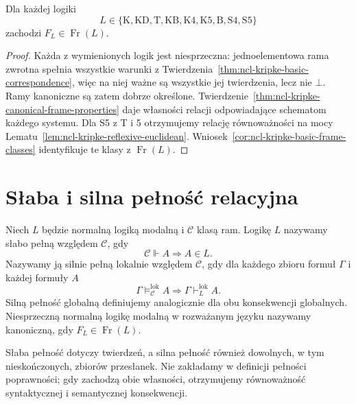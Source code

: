 \begin{wniosek}
\label{cor:ncl-kripke-basic-canonical-frames}
Dla każdej logiki
\[
 L\in\{\mathrm K,\mathrm{KD},\mathrm T,\mathrm{KB},
 \mathrm{K4},\mathrm{K5},\mathrm B,\mathrm{S4},\mathrm{S5}\}
\]
zachodzi $F_L\in\operatorname{Fr}(L)$.
\end{wniosek}
\begin{proof}
Każda z wymienionych logik jest niesprzeczna:
jednoelementowa rama zwrotna spełnia wszystkie
warunki z
Twierdzenia~\ref{thm:ncl-kripke-basic-correspondence},
więc na niej ważne są wszystkie jej twierdzenia,
lecz nie $\bot$. Ramy kanoniczne są zatem
dobrze określone.
Twierdzenie~\ref{thm:ncl-kripke-canonical-frame-properties}
daje własności relacji odpowiadające schematom
każdego systemu. Dla S5 z T i 5 otrzymujemy
relację równoważności na mocy
Lematu~\ref{lem:ncl-kripke-reflexive-euclidean}.
Wniosek~\ref{cor:ncl-kripke-basic-frame-classes}
identyfikuje te klasy z $\operatorname{Fr}(L)$.
\end{proof}

\section{Słaba i silna pełność relacyjna}

\begin{definicja}
\label{def:ncl-kripke-completeness-canonicity}
Niech $L$ będzie normalną logiką modalną
i $\mathcal C$ klasą ram.
Logikę $L$ nazywamy słabo pełną względem
$\mathcal C$, gdy
\[
 \mathcal C\Vdash A\Longrightarrow A\in L.
\]
Nazywamy ją silnie pełną lokalnie względem
$\mathcal C$, gdy dla każdego zbioru formuł
$\Gamma$ i każdej formuły $A$
\[
 \Gamma\models_{\mathcal C}^{\mathrm{lok}}A
 \Longrightarrow\Gamma\vdash_L^{\mathrm{lok}}A.
\]
Silną pełność globalną definiujemy analogicznie
dla obu konsekwencji globalnych.
Niesprzeczną normalną logikę modalną
w rozważanym języku nazywamy kanoniczną,
gdy $F_L\in\operatorname{Fr}(L)$.
\end{definicja}

Słaba pełność dotyczy twierdzeń, a silna
pełność również dowolnych, w tym nieskończonych,
zbiorów przesłanek. Nie zakładamy w definicji
pełności poprawności; gdy zachodzą obie własności,
otrzymujemy równoważność syntaktycznej
i semantycznej konsekwencji.

